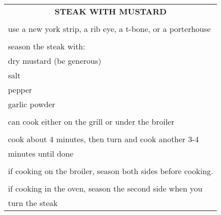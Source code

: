 \documentclass[8pt]{report}
\begin{document}
\newpage
\normalsize

\centering

\begin{tabular}{|l|} \hline	%
 
\multicolumn{1}{|c|}{\textbf{STEAK WITH MUSTARD}}
\\
\\

\index{fish/meat!steak with mustard} \index{steak with mustard}

use a new york strip, a rib eye, a t-bone, or a porterhouse\\
\\
season the steak with: \\
\hspace{0.5 in}	dry mustard (be generous)\\
\hspace{0.5 in}	salt \\
\hspace{0.5 in}	pepper\\
\hspace{0.5 in}	garlic powder\\
\\
can cook either on the grill or under the broiler\\
\\
cook about 4 minutes, then turn and cook another 3-4\\
minutes until done\\
\\
if cooking on the broiler, season both sides before cooking.\\
\\
if cooking in the oven, season the second side when you\\
turn the steak\\


\hline

\end{tabular}



\newpage

\centering
\end{document}
